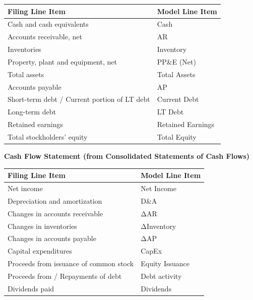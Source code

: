 \documentclass[11pt]{article}
\begin{document}
\begingroup
\small
\setlength{\tabcolsep}{2pt}
\begin{longtable}{>{\RaggedRight\arraybackslash\hspace{0pt}}p{}>{\RaggedRight\arraybackslash\hspace{0pt}}p{}}
\toprule
{} \textbf{Filing Line Item} & \textbf{Model Line Item} \\
\midrule
{} Cash and cash equivalents & Cash \\
{} Accounts receivable, net & AR \\
{} Inventories & Inventory \\
{} Property, plant and equipment, net & PP\&E (Net) \\
{} Total assets & Total Assets \\
{} Accounts payable & AP \\
{} Short-term debt /  Current portion of LT debt & Current Debt \\
{} Long-term debt & LT Debt \\
{} Retained earnings & Retained Earnings \\
{} Total stockholders' equity & Total Equity \\
\bottomrule
\end{longtable}
\endgroup

\textbf{Cash Flow Statement (from Consolidated Statements of Cash Flows)}


\begingroup
\small
\setlength{\tabcolsep}{2pt}
\begin{longtable}{>{\RaggedRight\arraybackslash\hspace{0pt}}p{}>{\RaggedRight\arraybackslash\hspace{0pt}}p{}}
\toprule
{} \textbf{Filing Line Item} & \textbf{Model Line Item} \\
\midrule
{} Net income & Net Income \\
{} Depreciation and amortization & D\&A \\
{} Changes in accounts receivable & ΔAR \\
{} Changes in inventories & ΔInventory \\
{} Changes in accounts payable & ΔAP \\
{} Capital expenditures & CapEx \\
{} Proceeds from issuance of common stock & Equity Issuance \\
{} Proceeds from /  Repayments of debt & Debt activity \\
{} Dividends paid & Dividends \\
\bottomrule
\end{longtable}
\endgroup
\end{document}
